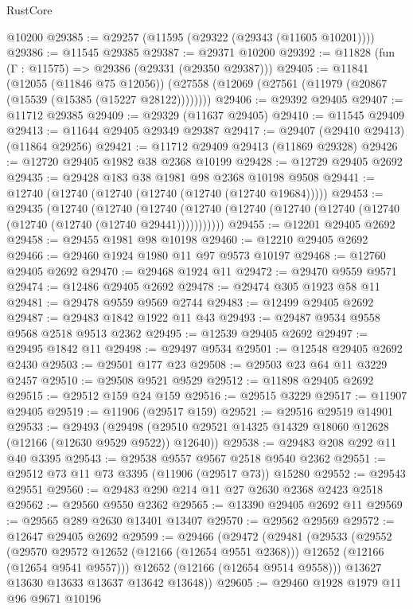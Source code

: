 \begin{lexlean}{RustCore}
\begin{coremodule}
    @10200
@29385 := @29257 (@11595 (@29322 (@29343 (@11605 @10201))))
@29386 := @11545 @29385
@29387 := @29371 @10200
@29392 := @11828 (fun (Γ : @11575) => @29386 (@29331 (@29350 @29387)))
@29405 := @11841
    (@12055 (@11846 @75 @12056))
    (@27558 (@12069 (@27561 (@11979 (@20867 (@15539 (@15385 (@15227 @28122))))))))
@29406 := @29392 @29405
@29407 := @11712 @29385
@29409 := @29329 (@11637 @29405)
@29410 := @11545 @29409
@29413 := @11644 @29405 @29349 @29387
@29417 := @29407 (@29410 @29413) (@11864 @29256)
@29421 := @11712 @29409 @29413 (@11869 @29328)
@29426 := @12720 @29405 @1982 @38 @2368 @10199
@29428 := @12729 @29405 @2692
@29435 := @29428 @183 @38 @1981 @98 @2368 @10198 @9508
@29441 := @12740 (@12740 (@12740 (@12740 (@12740 (@12740 @19684)))))
@29453 := @29435
    (@12740
      (@12740
        (@12740 (@12740 (@12740 (@12740 (@12740 (@12740 (@12740 (@12740 (@12740 @29441)))))))))))
@29455 := @12201 @29405 @2692
@29458 := @29455 @1981 @98 @10198
@29460 := @12210 @29405 @2692
@29466 := @29460 @1924 @1980 @11 @97 @9573 @10197
@29468 := @12760 @29405 @2692
@29470 := @29468 @1924 @11
@29472 := @29470 @9559 @9571
@29474 := @12486 @29405 @2692
@29478 := @29474 @305 @1923 @58 @11
@29481 := @29478 @9559 @9569 @2744
@29483 := @12499 @29405 @2692
@29487 := @29483 @1842 @1922 @11 @43
@29493 := @29487 @9534 @9558 @9568 @2518 @9513 @2362
@29495 := @12539 @29405 @2692
@29497 := @29495 @1842 @11
@29498 := @29497 @9534
@29501 := @12548 @29405 @2692 @2430
@29503 := @29501 @177 @23
@29508 := @29503 @23 @64 @11 @3229 @2457
@29510 := @29508 @9521 @9529
@29512 := @11898 @29405 @2692
@29515 := @29512 @159 @24 @159
@29516 := @29515 @3229
@29517 := @11907 @29405
@29519 := @11906 (@29517 @159)
@29521 := @29516 @29519 @14901
@29533 := @29493
    (@29498 (@29510 @29521 @14325 @14329 @18060 @12628 (@12166 (@12630 @9529 @9522)) @12640))
@29538 := @29483 @208 @292 @11 @40 @3395
@29543 := @29538 @9557 @9567 @2518 @9540 @2362
@29551 := @29512 @73 @11 @73 @3395 (@11906 (@29517 @73)) @15280
@29552 := @29543 @29551
@29560 := @29483 @290 @214 @11 @27 @2630 @2368 @2423 @2518
@29562 := @29560 @9550 @2362
@29565 := @13390 @29405 @2692 @11
@29569 := @29565 @289 @2630 @13401 @13407
@29570 := @29562 @29569
@29572 := @12647 @29405 @2692
@29599 := @29466
    (@29472
      (@29481
        (@29533
          (@29552
            (@29570 @29572 @12652 (@12166 (@12654 @9551 @2368)))
            @12652
            (@12166 (@12654 @9541 @9557)))
          @12652
          (@12166 (@12654 @9514 @9558)))
        @13627
        @13630
        @13633
        @13637
        @13642
        @13648))
@29605 := @29460 @1928 @1979 @11 @96 @9671 @10196

\end{coremodule}
\end{lexlean}
